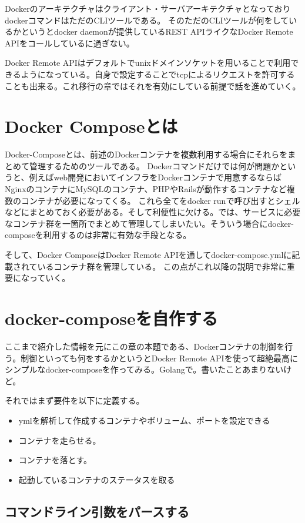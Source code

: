 Dockerのアーキテクチャはクライアント・サーバアーキテクチャとなっておりdockerコマンドはただのCLIツールである。
そのただのCLIツールが何をしているかというとdocker daemonが提供しているREST APIライクなDocker Remote APIをコールしているに過ぎない。


Docker Remote APIはデフォルトでunixドメインソケットを用いることで利用できるようになっている。自身で設定することでtcpによるリクエストを許可することも出来る。これ移行の章ではそれを有効にしている前提で話を進めていく。

\section{Docker Composeとは}

Docker-Composeとは、前述のDockerコンテナを複数利用する場合にそれらをまとめて管理するためのツールである。
Dockerコマンドだけでは何が問題かというと、例えばweb開発においてインフラをDockerコンテナで用意するならばNginxのコンテナにMySQLのコンテナ、PHPやRailsが動作するコンテナなど複数のコンテナが必要になってくる。
これら全てをdocker runで呼び出すとシェルなどにまとめておく必要がある。そして利便性に欠ける。では、サービスに必要なコンテナ群を一箇所でまとめて管理してしまいたい。そういう場合にdocker-composeを利用するのは非常に有効な手段となる。


そして、Docker ComposeはDocker Remote APIを通してdocker-compose.ymlに記載されているコンテナ群を管理している。
この点がこれ以降の説明で非常に重要になっていく。

\section{docker-composeを自作する}

ここまで紹介した情報を元にこの章の本題である、Dockerコンテナの制御を行う。制御といっても何をするかというとDocker Remote APIを使って超絶最高にシンプルなdocker-composeを作ってみる。Golangで。書いたことあまりないけど。


それではまず要件を以下に定義する。
\begin{itemize}
    \item ymlを解析して作成するコンテナやボリューム、ポートを設定できる
    \item コンテナを走らせる。
    \item コンテナを落とす。
    \item 起動しているコンテナのステータスを取る
\end{itemize}

\subsection{コマンドライン引数をパースする}

